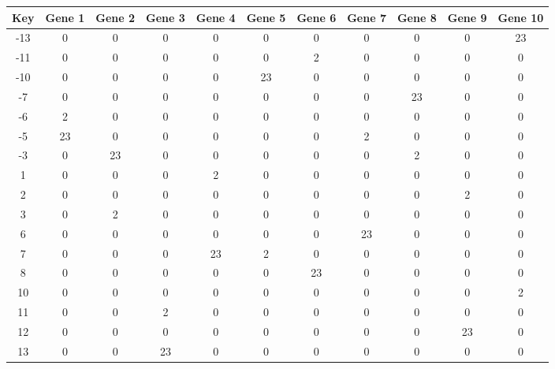 \begin{tabular}{|c|c|c|c|c|c|c|c|c|c|c|}
\hline
Key & Gene 1 & Gene 2 & Gene 3 & Gene 4 & Gene 5 & Gene 6 & Gene 7 & Gene 8 & Gene 9 & Gene 10 \\
\hline
-13 & 0 & 0 & 0 & 0 & 0 & 0 & 0 & 0 & 0 & 23 \\
-11 & 0 & 0 & 0 & 0 & 0 & 2 & 0 & 0 & 0 & 0 \\
-10 & 0 & 0 & 0 & 0 & 23 & 0 & 0 & 0 & 0 & 0 \\
-7 & 0 & 0 & 0 & 0 & 0 & 0 & 0 & 23 & 0 & 0 \\
-6 & 2 & 0 & 0 & 0 & 0 & 0 & 0 & 0 & 0 & 0 \\
-5 & 23 & 0 & 0 & 0 & 0 & 0 & 2 & 0 & 0 & 0 \\
-3 & 0 & 23 & 0 & 0 & 0 & 0 & 0 & 2 & 0 & 0 \\
1 & 0 & 0 & 0 & 2 & 0 & 0 & 0 & 0 & 0 & 0 \\
2 & 0 & 0 & 0 & 0 & 0 & 0 & 0 & 0 & 2 & 0 \\
3 & 0 & 2 & 0 & 0 & 0 & 0 & 0 & 0 & 0 & 0 \\
6 & 0 & 0 & 0 & 0 & 0 & 0 & 23 & 0 & 0 & 0 \\
7 & 0 & 0 & 0 & 23 & 2 & 0 & 0 & 0 & 0 & 0 \\
8 & 0 & 0 & 0 & 0 & 0 & 23 & 0 & 0 & 0 & 0 \\
10 & 0 & 0 & 0 & 0 & 0 & 0 & 0 & 0 & 0 & 2 \\
11 & 0 & 0 & 2 & 0 & 0 & 0 & 0 & 0 & 0 & 0 \\
12 & 0 & 0 & 0 & 0 & 0 & 0 & 0 & 0 & 23 & 0 \\
13 & 0 & 0 & 23 & 0 & 0 & 0 & 0 & 0 & 0 & 0 \\
\hline
\end{tabular}